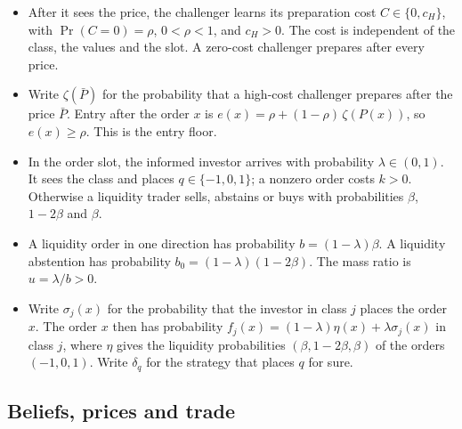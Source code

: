\begin{itemize}
\item After it sees the price, the challenger learns its preparation cost \(C\in\{0,c_H\}\), with
  \(\Pr(C=0)=\rho\), \(0<\rho<1\), and \(c_H>0\). The cost is independent of the class, the values and the slot.
  A zero-cost challenger prepares after every price.
\item Write \(\zeta(\bar P)\) for the probability that a high-cost challenger prepares after the price \(\bar P\).
  Entry after the order \(x\) is \(e(x)=\rho+(1-\rho)\,\zeta(P(x))\), so \(e(x)\ge\rho\). This is the entry
  floor.
\item In the order slot, the informed investor arrives with probability \(\lambda\in(0,1)\). It sees the class and
  places \(q\in\{-1,0,1\}\); a nonzero order costs \(k>0\). Otherwise a liquidity trader sells, abstains or buys with
  probabilities \(\beta\), \(1-2\beta\) and \(\beta\).
\item A liquidity order in one direction has probability \(b=(1-\lambda)\beta\). A liquidity abstention has
  probability \(b_0=(1-\lambda)(1-2\beta)\). The mass ratio is \(u=\lambda/b>0\).
\item Write \(\sigma_j(x)\) for the probability that the investor in class \(j\) places the order \(x\). The order
  \(x\) then has probability \(f_j(x)=(1-\lambda)\eta(x)+\lambda\sigma_j(x)\) in class \(j\), where \(\eta\) gives
  the liquidity probabilities \((\beta,1-2\beta,\beta)\) of the orders \((-1,0,1)\). Write \(\delta_q\) for the
  strategy that places \(q\) for sure.
\end{itemize}

\subsection{Beliefs, prices and trade}

